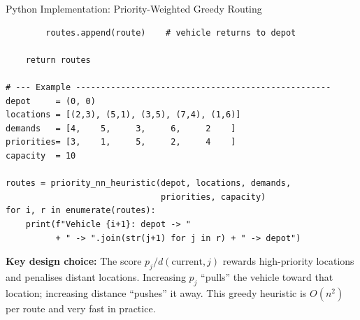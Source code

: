 \documentclass[aspectratio=169,10pt]{beamer}
\begin{document}
\begin{frame}[fragile]{Python Implementation: Priority-Weighted Greedy Routing}
\begin{lstlisting}
        routes.append(route)    # vehicle returns to depot

    return routes

# --- Example ---------------------------------------------------
depot     = (0, 0)
locations = [(2,3), (5,1), (3,5), (7,4), (1,6)]
demands   = [4,    5,     3,     6,     2    ]
priorities= [3,    1,     5,     2,     4    ]
capacity  = 10

routes = priority_nn_heuristic(depot, locations, demands,
                               priorities, capacity)
for i, r in enumerate(routes):
    print(f"Vehicle {i+1}: depot -> "
          + " -> ".join(str(j+1) for j in r) + " -> depot")
\end{lstlisting}

  \medskip
  \textbf{Key design choice:} The score $p_j / d(\text{current}, j)$
  rewards high-priority locations and penalises distant locations.
  Increasing $p_j$ ``pulls'' the vehicle toward that location;
  increasing distance ``pushes'' it away.
  This greedy heuristic is $O(n^2)$ per route and very fast in practice.
\end{frame}
\end{document}
